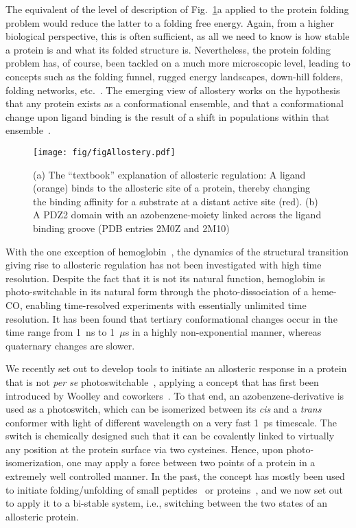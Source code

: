 \documentclass[journal=jacsat,manuscript=article]{achemso}
\begin{document}
The equivalent of the level of description of Fig.~\ref{figAllostery}a
applied to the protein folding problem would reduce the latter to a
folding free energy. Again, from a higher biological perspective, this
is often sufficient, as all we need to know is how stable a protein is
and what its folded structure is. Nevertheless, the protein folding
problem has, of course, been tackled on a much more microscopic level,
leading to concepts such as the folding funnel, rugged energy
landscapes, down-hill folders, folding networks, etc.~\cite{brooks98,
  dill08,kubelka04,Gruebele99,krivov04,caflisch06}. The emerging view
of allostery works on the hypothesis that any protein exists as a
conformational ensemble, and that a conformational change upon ligand
binding is the result of a shift in populations within that
ensemble~\cite{gunasekaran04, tsai14}.



\begin{figure}[t]
\centering
\texttt{[image: fig/figAllostery.pdf]}
\caption{(a) The ``textbook'' explanation of allosteric regulation: A
  ligand (orange) binds to the allosteric site of a protein, thereby
  changing the binding affinity for a substrate at a distant active
  site (red). (b) A PDZ2 domain with an azobenzene-moiety linked
  across the ligand binding groove (PDB entries 2M0Z and 2M10)}
\label{figAllostery}
\end{figure}

With the one exception of hemoglobin~\cite{Eaton99}, the dynamics of
the structural transition giving rise to allosteric regulation has not
been investigated with high time resolution. Despite the fact that it
is not its natural function, hemoglobin is photo-switchable in its
natural form through the photo-dissociation of a heme-CO, enabling
time-resolved experiments with essentially unlimited time
resolution. It has been found that tertiary conformational changes
occur in the time range from 1~ns to 1~$\mu$s in a highly
non-exponential manner, whereas quaternary changes are slower.

We recently set out to develop tools to initiate an allosteric
response in a protein that is not \textit{per se}
photoswitchable~\cite{buchli13,waldauer14,buchenberg14}, applying a
concept that has first been introduced by Woolley and
coworkers~\cite{kum00, woolley05, beharry11}. To that end, an
azobenzene-derivative is used as a photoswitch, which can be
isomerized between its \textit{cis} and a \textit{trans} conformer
with light of different wavelength on a very fast 1~ps timescale. The
switch is chemically designed such that it can be covalently linked to
virtually any position at the protein surface via two
cysteines. Hence, upon photo-isomerization, one may apply a force
between two points of a protein in a extremely well controlled
manner. In the past, the concept has mostly been used to initiate
folding/unfolding of small peptides~\cite{ihalainen08,schrader07} or
proteins~\cite{zhang09}, and we now set out to apply it to a bi-stable
system, i.e., switching between the two states of an allosteric
protein.
\end{document}

